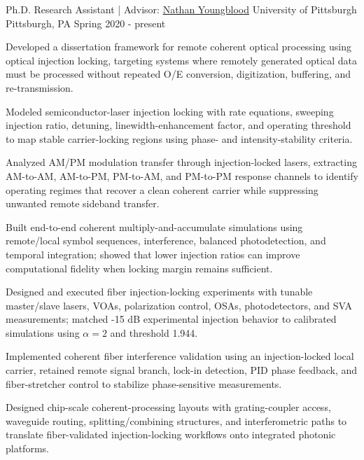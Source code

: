 
\begin{cventries}

  \cventry
    {Ph.D. Research Assistant | Advisor: \href{https://pitt-photonics.github.io/}{Nathan Youngblood}}
    {University of Pittsburgh}
    {Pittsburgh, PA}
    {Spring 2020 - present}
    {
      \begin{cvitems}
        \item {Developed a dissertation framework for remote coherent optical processing using optical injection locking, targeting systems where remotely generated optical data must be processed without repeated O/E conversion, digitization, buffering, and re-transmission.}
        \item {Modeled semiconductor-laser injection locking with rate equations, sweeping injection ratio, detuning, linewidth-enhancement factor, and operating threshold to map stable carrier-locking regions using phase- and intensity-stability criteria.}
        \item {Analyzed AM/PM modulation transfer through injection-locked lasers, extracting AM-to-AM, AM-to-PM, PM-to-AM, and PM-to-PM response channels to identify operating regimes that recover a clean coherent carrier while suppressing unwanted remote sideband transfer.}
        \item {Built end-to-end coherent multiply-and-accumulate simulations using remote/local symbol sequences, interference, balanced photodetection, and temporal integration; showed that lower injection ratios can improve computational fidelity when locking margin remains sufficient.}
        \item {Designed and executed fiber injection-locking experiments with tunable master/slave lasers, VOAs, polarization control, OSAs, photodetectors, and SVA measurements; matched -15 dB experimental injection behavior to calibrated simulations using $\alpha=2$ and threshold 1.944.}
        \item {Implemented coherent fiber interference validation using an injection-locked local carrier, retained remote signal branch, lock-in detection, PID phase feedback, and fiber-stretcher control to stabilize phase-sensitive measurements.}
        \item {Designed chip-scale coherent-processing layouts with grating-coupler access, waveguide routing, splitting/combining structures, and interferometric paths to translate fiber-validated injection-locking workflows onto integrated photonic platforms.}
      \end{cvitems}
    }


\end{cventries}
